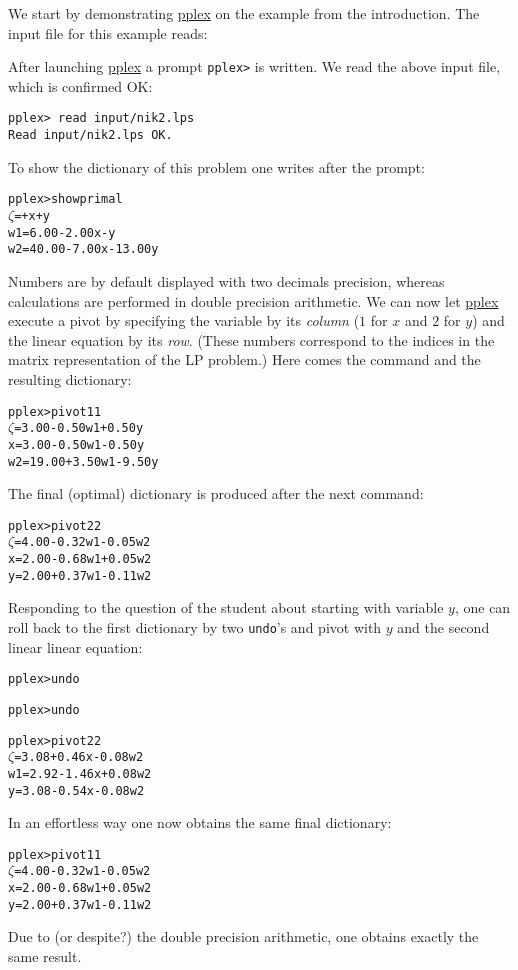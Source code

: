 \documentclass[ukenglish]{nik}
\begin{document}
We start by demonstrating \url{pplex} on the example from the introduction.
The input file for this example reads:
\begin{alltt}

\end{alltt}
After launching \url{pplex} a prompt \verb|pplex>| is written.
We read the above input file, which is confirmed OK:
\begin{verbatim}
pplex> read input/nik2.lps
Read input/nik2.lps OK.
\end{verbatim}
To show the dictionary of this problem one writes after the prompt:
\begin{alltt}
pplex> show primal
 \(\zeta\) =       +     x +      y
w1 =  6.00 - 2.00x -      y
w2 = 40.00 - 7.00x - 13.00y
\end{alltt}
Numbers are by default displayed with two decimals precision, whereas
calculations are performed in double precision arithmetic.
We can now let \url{pplex} execute a pivot by specifying
the variable by its \emph{column} ($1$ for $x$ and $2$ for $y$)
and the linear equation by its \emph{row}. (These numbers correspond to
the indices in the matrix representation of the LP problem.)
Here comes the command and the resulting dictionary:
\begin{alltt}
pplex> pivot 1 1
 \(\zeta\) =  3.00 - 0.50w1 + 0.50y
 x =  3.00 - 0.50w1 - 0.50y
w2 = 19.00 + 3.50w1 - 9.50y
\end{alltt}
The final (optimal) dictionary is produced after the next command:
\begin{alltt}
pplex> pivot 2 2
 \(\zeta\) = 4.00 - 0.32w1 - 0.05w2
 x = 2.00 - 0.68w1 + 0.05w2
 y = 2.00 + 0.37w1 - 0.11w2
\end{alltt}
Responding to the question of the student about starting with variable $y$, 
one can roll back to the first dictionary by two \verb|undo|'s and pivot
with $y$ and the second linear linear equation:
\begin{alltt}
pplex> undo

pplex> undo

pplex> pivot 2 2
 \(\zeta\) = 3.08 + 0.46x - 0.08w2
w1 = 2.92 - 1.46x + 0.08w2
 y = 3.08 - 0.54x - 0.08w2
\end{alltt}
In an effortless way one now obtains the same final dictionary:
\begin{alltt}
pplex> pivot 1 1 
 \(\zeta\) = 4.00 - 0.32w1 - 0.05w2
 x = 2.00 - 0.68w1 + 0.05w2
 y = 2.00 + 0.37w1 - 0.11w2
\end{alltt}
Due to (or despite?) the double precision arithmetic, one obtains exactly the same result.
\end{document}
